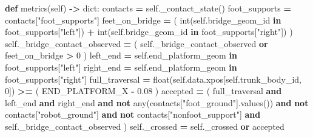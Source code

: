 \documentclass[
  chinese,
  11pt,
  letterpaper,
]{article}
\newenvironment{Shaded}{\begin{snugshade}}{\end{snugshade}}
\newcommand{\BuiltInTok}[1]{#1}
\newcommand{\DecValTok}[1]{\textcolor[rgb]{0.00,0.00,0.81}{#1}}
\newcommand{\FloatTok}[1]{\textcolor[rgb]{0.00,0.00,0.81}{#1}}
\newcommand{\KeywordTok}[1]{\textcolor[rgb]{0.13,0.29,0.53}{\textbf{#1}}}
\newcommand{\NormalTok}[1]{#1}
\newcommand{\OperatorTok}[1]{\textcolor[rgb]{0.81,0.36,0.00}{\textbf{#1}}}
\newcommand{\StringTok}[1]{\textcolor[rgb]{0.31,0.60,0.02}{#1}}
\newcommand{\VariableTok}[1]{\textcolor[rgb]{0.00,0.00,0.00}{#1}}
\renewenvironment{Shaded}{\par\smallskip}{\par\smallskip}
\begin{document}
\begin{Shaded}
\begin{Highlighting}[]
    \KeywordTok{def}\NormalTok{ metrics(}\VariableTok{self}\NormalTok{) }\OperatorTok{{-}\textgreater{}} \BuiltInTok{dict}\NormalTok{:}
\NormalTok{        contacts }\OperatorTok{=} \VariableTok{self}\NormalTok{.\_contact\_state()}
\NormalTok{        foot\_supports }\OperatorTok{=}\NormalTok{ contacts[}\StringTok{"foot\_supports"}\NormalTok{]}
\NormalTok{        feet\_on\_bridge }\OperatorTok{=}\NormalTok{ (}
            \BuiltInTok{int}\NormalTok{(}\VariableTok{self}\NormalTok{.bridge\_geom\_id }\KeywordTok{in}\NormalTok{ foot\_supports[}\StringTok{"left"}\NormalTok{])}
            \OperatorTok{+} \BuiltInTok{int}\NormalTok{(}\VariableTok{self}\NormalTok{.bridge\_geom\_id }\KeywordTok{in}\NormalTok{ foot\_supports[}\StringTok{"right"}\NormalTok{])}
\NormalTok{        )}
        \VariableTok{self}\NormalTok{.\_bridge\_contact\_observed }\OperatorTok{=}\NormalTok{ (}
            \VariableTok{self}\NormalTok{.\_bridge\_contact\_observed }\KeywordTok{or}\NormalTok{ feet\_on\_bridge }\OperatorTok{\textgreater{}} \DecValTok{0}
\NormalTok{        )}
\NormalTok{        left\_end }\OperatorTok{=} \VariableTok{self}\NormalTok{.end\_platform\_geom }\KeywordTok{in}\NormalTok{ foot\_supports[}\StringTok{"left"}\NormalTok{]}
\NormalTok{        right\_end }\OperatorTok{=} \VariableTok{self}\NormalTok{.end\_platform\_geom }\KeywordTok{in}\NormalTok{ foot\_supports[}\StringTok{"right"}\NormalTok{]}
\NormalTok{        full\_traversal }\OperatorTok{=} \BuiltInTok{float}\NormalTok{(}\VariableTok{self}\NormalTok{.data.xpos[}\VariableTok{self}\NormalTok{.trunk\_body\_id, }\DecValTok{0}\NormalTok{]) }\OperatorTok{\textgreater{}=}\NormalTok{ (}
\NormalTok{            END\_PLATFORM\_X }\OperatorTok{{-}} \FloatTok{0.08}
\NormalTok{        )}
\NormalTok{        accepted }\OperatorTok{=}\NormalTok{ (}
\NormalTok{            full\_traversal}
            \KeywordTok{and}\NormalTok{ left\_end}
            \KeywordTok{and}\NormalTok{ right\_end}
            \KeywordTok{and} \KeywordTok{not} \BuiltInTok{any}\NormalTok{(contacts[}\StringTok{"foot\_ground"}\NormalTok{].values())}
            \KeywordTok{and} \KeywordTok{not}\NormalTok{ contacts[}\StringTok{"robot\_ground"}\NormalTok{]}
            \KeywordTok{and} \KeywordTok{not}\NormalTok{ contacts[}\StringTok{"nonfoot\_support"}\NormalTok{]}
            \KeywordTok{and} \VariableTok{self}\NormalTok{.\_bridge\_contact\_observed}
\NormalTok{        )}
        \VariableTok{self}\NormalTok{.\_crossed }\OperatorTok{=} \VariableTok{self}\NormalTok{.\_crossed }\KeywordTok{or}\NormalTok{ accepted}


\end{Highlighting}
\end{Shaded}
\end{document}
